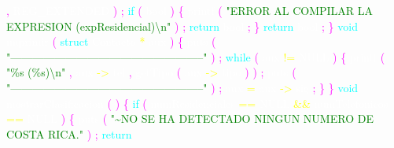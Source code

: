 \textcolor{magenta}{,} 
\textcolor{white}{REG\_EXTENDED} 
\textcolor{magenta}{)} 
\textcolor{magenta}{;} 
\textcolor{cyan}{if} 
\textcolor{magenta}{(} 
\textcolor{white}{bool} 
\textcolor{magenta}{)} 
\textcolor{magenta}{\{} 
\textcolor{white}{printf} 
\textcolor{magenta}{(} 
\textcolor{green}{"ERROR AL COMPILAR LA EXPRESION (expResidencial)\textbackslash n"} 
\textcolor{magenta}{)} 
\textcolor{magenta}{;} 
\textcolor{cyan}{return} 
\textcolor{white}{bool} 
\textcolor{magenta}{;} 
\textcolor{magenta}{\}} 
\textcolor{cyan}{return} 
\textcolor{white}{bool} 
\textcolor{magenta}{;} 
\textcolor{magenta}{\}} 
\textcolor{cyan}{void} 
\textcolor{white}{imprimir} 
\textcolor{magenta}{(} 
\textcolor{cyan}{struct} 
\textcolor{white}{Contacto} 
\textcolor{yellow}{*} 
\textcolor{white}{aux} 
\textcolor{magenta}{)} 
\textcolor{magenta}{\{} 
\textcolor{white}{puts} 
\textcolor{magenta}{(} 
\textcolor{green}{"-----------------------------------------------------"} 
\textcolor{magenta}{)} 
\textcolor{magenta}{;} 
\textcolor{cyan}{while} 
\textcolor{magenta}{(} 
\textcolor{white}{aux} 
\textcolor{yellow}{!=} 
\textcolor{white}{NULL} 
\textcolor{magenta}{)} 
\textcolor{magenta}{\{} 
\textcolor{white}{printf} 
\textcolor{magenta}{(} 
\textcolor{green}{"\%s (\%s)\textbackslash n"} 
\textcolor{magenta}{,} 
\textcolor{white}{aux} 
\textcolor{yellow}{->} 
\textcolor{white}{tel} 
\textcolor{magenta}{,} 
\textcolor{white}{getTipo} 
\textcolor{magenta}{(} 
\textcolor{white}{aux} 
\textcolor{yellow}{->} 
\textcolor{white}{tipo} 
\textcolor{magenta}{)} 
\textcolor{magenta}{)} 
\textcolor{magenta}{;} 
\textcolor{white}{puts} 
\textcolor{magenta}{(} 
\textcolor{green}{"-----------------------------------------------------"} 
\textcolor{magenta}{)} 
\textcolor{magenta}{;} 
\textcolor{white}{aux} 
\textcolor{yellow}{=} 
\textcolor{white}{aux} 
\textcolor{yellow}{->} 
\textcolor{white}{sig} 
\textcolor{magenta}{;} 
\textcolor{magenta}{\}} 
\textcolor{magenta}{\}} 
\textcolor{cyan}{void} 
\textcolor{white}{mostrarClasificacion} 
\textcolor{magenta}{(} 
\textcolor{magenta}{)} 
\textcolor{magenta}{\{} 
\textcolor{cyan}{if} 
\textcolor{magenta}{(} 
\textcolor{white}{numResidenciales} 
\textcolor{yellow}{==} 
\textcolor{white}{NULL} 
\textcolor{yellow}{\&\&} 
\textcolor{white}{numTelefonicos} 
\textcolor{yellow}{==} 
\textcolor{white}{NULL} 
\textcolor{magenta}{)} 
\textcolor{magenta}{\{} 
\textcolor{white}{puts} 
\textcolor{magenta}{(} 
\textcolor{green}{"\textasciitilde  NO SE HA DETECTADO NINGUN NUMERO DE COSTA RICA."} 
\textcolor{magenta}{)} 
\textcolor{magenta}{;} 
\textcolor{cyan}{return} 

